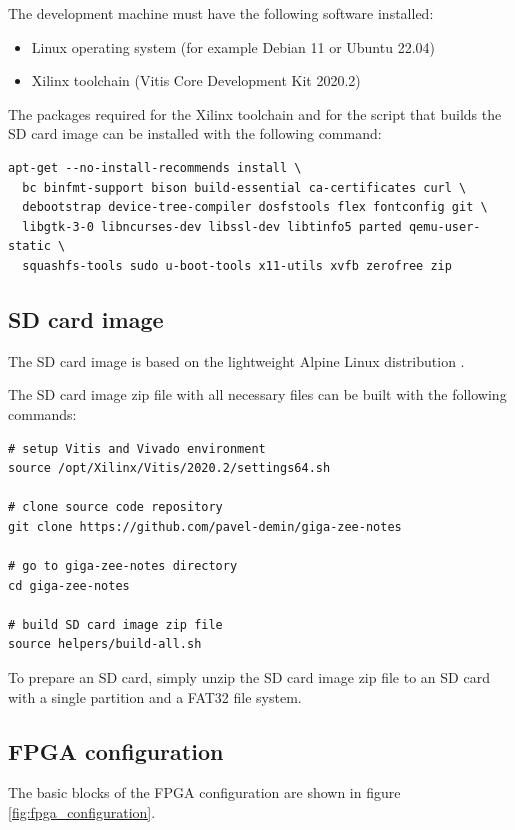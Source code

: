 \documentclass[12pt, a4paper]{article}
\begin{document}
The development machine must have the following software installed:
\begin{itemize}[nosep]
    \item Linux operating system (for example Debian 11 or Ubuntu 22.04)
    \item Xilinx toolchain (Vitis Core Development Kit 2020.2) \cite{vitis}
\end{itemize}

The packages required for the Xilinx toolchain and for the script that builds the SD card image can be installed with the following command:
\vspace{-1ex}
\begin{verbatim}
apt-get --no-install-recommends install \
  bc binfmt-support bison build-essential ca-certificates curl \
  debootstrap device-tree-compiler dosfstools flex fontconfig git \
  libgtk-3-0 libncurses-dev libssl-dev libtinfo5 parted qemu-user-static \
  squashfs-tools sudo u-boot-tools x11-utils xvfb zerofree zip
\end{verbatim}

\subsection{SD card image}

The SD card image is based on the lightweight Alpine Linux distribution \cite{alpine}.

The SD card image zip file with all necessary files can be built with the following commands:
\vspace{-1ex}
\begin{verbatim}
# setup Vitis and Vivado environment
source /opt/Xilinx/Vitis/2020.2/settings64.sh

# clone source code repository
git clone https://github.com/pavel-demin/giga-zee-notes

# go to giga-zee-notes directory
cd giga-zee-notes

# build SD card image zip file
source helpers/build-all.sh
\end{verbatim}

To prepare an SD card, simply unzip the SD card image zip file to an SD card with a single partition and a FAT32 file system.

\subsection{FPGA configuration}

The basic blocks of the FPGA configuration are shown in figure \ref{fig:fpga_configuration}.
\end{document}
